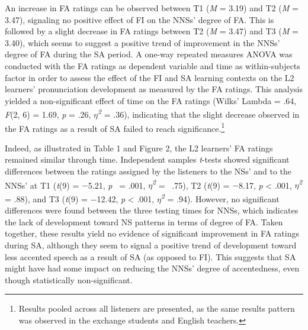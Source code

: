 \documentclass[12pt]{article}
\newenvironment{styleStandard}{\setlength\leftskip{0cm}\setlength\rightskip{0cm plus 1fil}\setlength\parindent{0cm}\setlength\parfillskip{0pt plus 1fil}\setlength\parskip{0in plus 1pt}\writerlistparindent\writerlistleftskip\leavevmode\normalfont\normalsize\writerlistlabel\ignorespaces}{\unskip\vspace{0.111in plus 0.0111in}\par}
\newcommand\writerlistleftskip{}
\newcommand\writerlistparindent{}
\newcommand\writerlistlabel{}
\begin{document}
\begin{styleStandard}
An increase in FA ratings can be observed between T1 (\textit{M} = 3.19) and T2 (\textit{M} = 3.47), signaling no positive effect of FI on the NNSs’ degree of FA. This is followed by a slight decrease in FA ratings between T2 (\textit{M} = 3.47) and T3 (\textit{M} = 3.40), which seems to suggest a positive trend of improvement in the NNSs’ degree of FA during the SA period. A one-way repeated measures ANOVA was conducted with the FA ratings as dependent variable and time as within-subjects factor in order to assess the effect of the FI and SA learning contexts on the L2 learners’ pronunciation development as measured by the FA ratings. This analysis yielded a non-significant effect of time on the FA ratings (Wilks’ Lambda = .64, \textit{F}(2, 6) = 1.69, \textit{p} = .26, \textit{$\eta $}\textit{\textsuperscript{2 }}= .36), indicating that the slight decrease observed in the FA ratings as a result of SA failed to reach significance.\footnote{ Results pooled across all listeners are presented, as the same results pattern was observed in the exchange students and English teachers.}
\end{styleStandard}

\begin{styleStandard}
Indeed, as illustrated in Table 1 and Figure 2, the L2 learners’ FA ratings remained similar through time. Independent samples \textit{t}{}-tests showed significant differences between the ratings assigned by the listeners to the NSs’ and to the NNSs’ at T1 (\textit{t}(9) = $-$5.21, \textit{p} \ = .001, \textit{$\eta $}\textit{\textsuperscript{2 }}= \ .75), T2 (\textit{t}(9) = $-$8.17, \textit{p} {\textless} .001, \textit{$\eta $}\textit{\textsuperscript{2 }}= .88), and T3 (\textit{t}(9) = $-$12.42, \textit{p} {\textless} .001, \textit{$\eta $}\textit{\textsuperscript{2 }}= .94). However, no significant differences were found between the three testing times for NNSs, which indicates the lack of development toward NS patterns in terms of degree of FA. Taken together, these results yield no evidence of significant improvement in FA ratings during SA, although they seem to signal a positive trend of development toward less accented speech as a result of SA (as opposed to FI). This suggests that SA might have had some impact on reducing the NNSs’ degree of accentedness, even though statistically non-significant.
\end{styleStandard}
\end{document}
